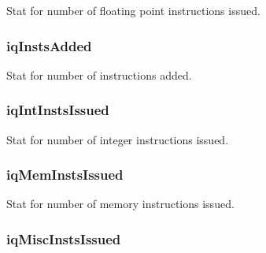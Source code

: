 \label{classInstQueue_aa9f2fa124c9f0b4b22461b6717449d9a}
Stat for number of floating point instructions issued. \hypertarget{classInstQueue_a435e1ce10c3a7f54a60941e583adeb09}{
\subsubsection[{iqInstsAdded}]{ {\bf iqInstsAdded}}}
\label{classInstQueue_a435e1ce10c3a7f54a60941e583adeb09}
Stat for number of instructions added. \hypertarget{classInstQueue_a735f2023e70e53b7889a3a316bd3d57f}{
\subsubsection[{iqIntInstsIssued}]{ {\bf iqIntInstsIssued}}}
\label{classInstQueue_a735f2023e70e53b7889a3a316bd3d57f}
Stat for number of integer instructions issued. \hypertarget{classInstQueue_a5e7d55d3f07e86e389ca3a715766e108}{
\subsubsection[{iqMemInstsIssued}]{ {\bf iqMemInstsIssued}}}
\label{classInstQueue_a5e7d55d3f07e86e389ca3a715766e108}
Stat for number of memory instructions issued. \hypertarget{classInstQueue_ad234890bc414fffe7ed71840c51be5cb}{
\subsubsection[{iqMiscInstsIssued}]{ {\bf iqMiscInstsIssued}}}
